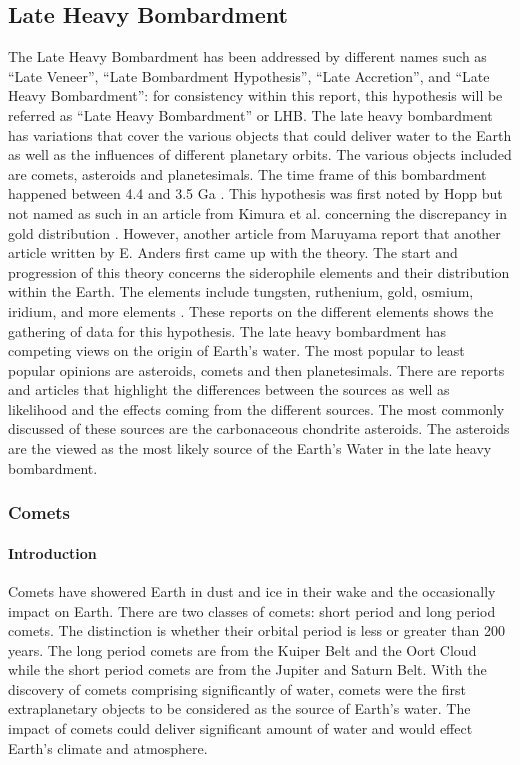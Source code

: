 \subsection{Late Heavy Bombardment}
The Late Heavy Bombardment has been addressed by different names such as “Late Veneer”, “Late Bombardment Hypothesis”, “Late Accretion”, and “Late Heavy Bombardment”: for consistency within this report, this hypothesis will be referred as “Late Heavy Bombardment” or LHB. The late heavy bombardment has variations that cover the various objects that could deliver water to the Earth as well as the influences of different planetary orbits. The various objects included are comets, asteroids and planetesimals. The time frame of this bombardment happened between 4.4 and 3.5 Ga \cite{LHB_Timeframe}. This hypothesis was first noted by Hopp\cite{BOMB1} but not named as such in an article from Kimura et al. concerning the discrepancy in gold distribution \cite{BOMB2}. However, another article from Maruyama \cite{BOMB3} report that another article written by E. Anders \cite{BOMB4} first came up with the theory. The start and progression of this theory concerns the siderophile elements and their distribution within the Earth. The elements include tungsten, ruthenium, gold, osmium, iridium, and more elements \cite{BOMB5} \cite{BOMB6} \cite{BOMB7}. These reports on the different elements shows the gathering of data for this hypothesis. The late heavy bombardment has competing views on the origin of Earth’s water. The most popular to least popular opinions are asteroids, comets and then planetesimals. There are reports and articles \cite{BOMB8} \cite{BOMB9} \cite{BOMB10} that highlight the differences between the sources as well as likelihood and the effects coming from the different sources. The most commonly discussed of these sources are the carbonaceous chondrite asteroids. The asteroids are the viewed as the most likely source of the Earth’s Water in the late heavy bombardment.

\subsubsection{Comets}

\paragraph{Introduction}

Comets have showered Earth in dust and ice in their wake and the occasionally impact on Earth. 
There are two classes of comets: short period and long period comets. 
The distinction is whether their orbital period is less or greater than 200 years. 
The long period comets are from the Kuiper Belt and the Oort Cloud while the short period comets are from the Jupiter and Saturn Belt.
With the discovery of comets comprising significantly of water, comets were the first extraplanetary objects to be considered as the source of Earth's water. The impact of comets could deliver significant amount of water and would effect Earth's climate and atmosphere.

